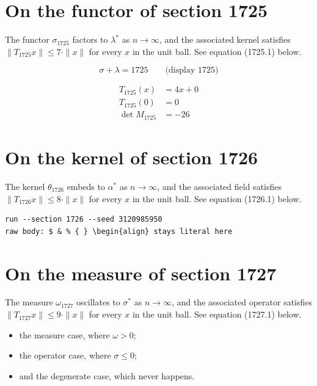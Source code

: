 \documentclass{article}
\begin{document}
\section{On the functor of section 1725}
The functor $\sigma_{1725}$ factors to $\lambda^{*}$ as $n \to \infty$,
and the associated kernel satisfies $\|T_{1725} x\| \leq 7 \cdot \|x\|$
for every $x$ in the unit ball. See equation (1725.1) below.

$$
\sigma + \lambda = 1725 \qquad \text{(display 1725)}
$$

\begin{align}
T_{1725}(x) &= 4 x + 0 \\
T_{1725}(0) &= 0 \\
\det M_{1725} &= -26
\end{align}

\section{On the kernel of section 1726}
The kernel $\theta_{1726}$ embeds to $\alpha^{*}$ as $n \to \infty$,
and the associated field satisfies $\|T_{1726} x\| \leq 8 \cdot \|x\|$
for every $x$ in the unit ball. See equation (1726.1) below.

\begin{verbatim}
run --section 1726 --seed 3120985950
raw body: $ & % { } \begin{align} stays literal here
\end{verbatim}

\section{On the measure of section 1727}
The measure $\omega_{1727}$ oscillates to $\sigma^{*}$ as $n \to \infty$,
and the associated operator satisfies $\|T_{1727} x\| \leq 9 \cdot \|x\|$
for every $x$ in the unit ball. See equation (1727.1) below.

\begin{itemize}
  \item the measure case, where $\omega > 0$;
  \item the operator case, where $\sigma \leq 0$;
  \item and the degenerate case, which never happens.
\end{itemize}
\end{document}
